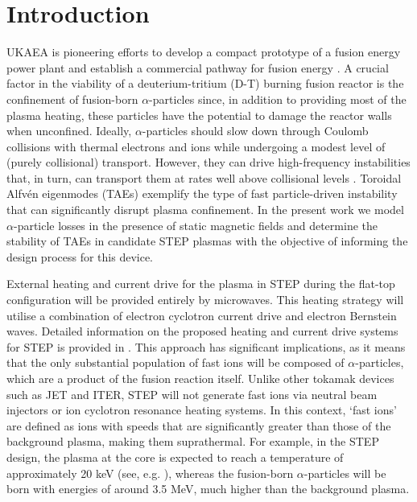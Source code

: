 \documentclass[10pt, a4paper, twoside]{article}
\begin{document}
\setlength{\parindent}{0pt}
\fontsize{10}{13}\selectfont

\section{Introduction}
\label{sec:introduction}

UKAEA is pioneering efforts to develop a compact prototype of a fusion energy power plant and establish a commercial pathway for fusion energy \cite{nuttall2020, meyer2023, mitchell2023}. A crucial factor in the viability of a deuterium-tritium (D-T) burning fusion reactor is the confinement of fusion-born $\alpha$-particles since, in addition to providing most of the plasma heating, these particles have the potential to damage the reactor walls when unconfined. Ideally, $\alpha$-particles should slow down through Coulomb collisions with thermal electrons and ions while undergoing a modest level of (purely collisional) transport. However, they can drive high-frequency instabilities that, in turn, can transport them at rates well above collisional levels \cite{garcia-munoz2011}. Toroidal Alfv\'en eigenmodes (TAEs) exemplify the type of fast particle-driven instability that can significantly disrupt plasma confinement. In the present work we model $\alpha$-particle losses in the presence of static magnetic fields and determine the stability of TAEs in candidate STEP plasmas with the objective of informing the design process for this device.

External heating and current drive for the plasma in STEP during the flat-top configuration will be provided entirely by microwaves. This heating strategy will utilise a combination of electron cyclotron current drive and electron Bernstein waves. Detailed information on the proposed heating and current drive systems for STEP is provided in \cite{Henderson2024}.
This approach has significant implications, as it means that the only substantial population of fast ions will be composed of $\alpha$-particles, which are a product of the fusion reaction itself. Unlike other tokamak devices such as JET and ITER, STEP will not generate fast ions via neutral beam injectors or ion cyclotron resonance heating systems.
In this context, `fast ions' are defined as ions with speeds that are significantly greater than those of the background plasma, making them suprathermal. For example, in the STEP design, the plasma at the core is expected to reach a temperature of approximately 20 keV (see, e.g. \cite{meyer2023,mitchell2023}), whereas the fusion-born $\alpha$-particles will be born with energies of around 3.5 MeV, much higher than the background plasma.
\end{document}
